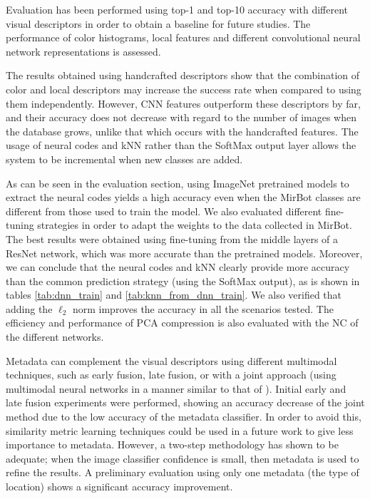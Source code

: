 \documentclass[final, twocolumn]{elsarticle}
\begin{document}
Evaluation has been performed using top-1 and top-10 accuracy with different visual descriptors in order to obtain a baseline for future studies. The performance of color histograms, local features and different convolutional neural network representations is assessed.

The results obtained using handcrafted descriptors show that the combination of color and local descriptors may increase the success rate  when compared to using them independently. However, CNN features outperform these descriptors by far, and their accuracy does not decrease with regard to the number of images when the database grows, unlike that which occurs with the handcrafted features.  The usage of neural codes and kNN rather than the SoftMax output layer allows the system to be incremental when new classes are added.

As can be seen in the evaluation section, using ImageNet pretrained models to extract the neural codes yields a high accuracy even when the MirBot classes are different from those used to train the model. We also evaluated different fine-tuning strategies in order to adapt the weights to the data collected in MirBot. The best results were obtained using fine-tuning from the middle layers of a ResNet network, which was more accurate than the pretrained models. Moreover, we can conclude that the neural codes and kNN clearly provide more accuracy than the common prediction strategy (using the SoftMax output), as is shown in tables \ref{tab:dnn_train} and \ref{tab:knn_from_dnn_train}. We also verified that adding the $\ell_2$ norm improves the accuracy in all the scenarios tested. The efficiency and performance of PCA compression is also evaluated with the NC of the different networks. %




Metadata can complement the visual descriptors using different multimodal techniques, such as early fusion, late fusion, or with a joint approach (using multimodal neural networks in a manner similar to that of \cite{Mao2014ExplainNetworks}). Initial early and late fusion experiments were performed, showing an accuracy decrease of the joint method due to the low accuracy of the metadata classifier. In order to avoid this, similarity metric learning techniques \citep{Bellet2012SimilarityClassification} could be used in a future work to give less importance to metadata. However, a two-step methodology has shown to be adequate; when the image classifier confidence is small, then metadata is used to refine the results. A preliminary evaluation using only one metadata (the type of location) shows a significant accuracy improvement.
\end{document}
